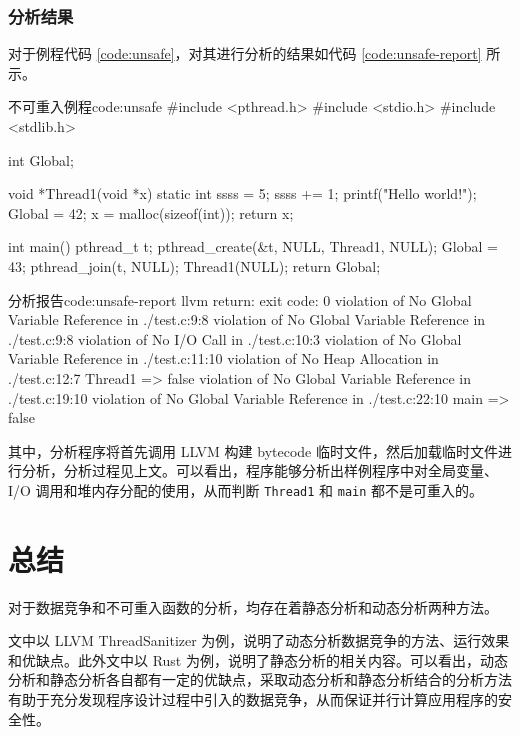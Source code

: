 \documentclass[a4paper, 12pt]{article} %
\newcounter{code}
\numberwithin{equation}{section}
\begin{document}
\subsubsection{分析结果}

对于例程代码 \ref{code:unsafe}，对其进行分析的结果如代码 \ref{code:unsafe-report} 所示。

\begin{code}[c]{不可重入例程}{code:unsafe}
  #include <pthread.h>
  #include <stdio.h>
  #include <stdlib.h>
  
  int Global;
  
  void *Thread1(void *x) {
    static int ssss = 5;
    ssss += 1;
    printf("Hello world!");
    Global = 42;
    x = malloc(sizeof(int));
    return x;
  }
  
  int main() {
    pthread_t t;
    pthread_create(&t, NULL, Thread1, NULL);
    Global = 43;
    pthread_join(t, NULL);
    Thread1(NULL);
    return Global;
  }  
\end{code}

\begin{code}[{}]{分析报告}{code:unsafe-report}
  llvm return: exit code: 0
  violation of No Global Variable Reference in ./test.c:9:8
  violation of No Global Variable Reference in ./test.c:9:8
  violation of No I/O Call in ./test.c:10:3
  violation of No Global Variable Reference in ./test.c:11:10
  violation of No Heap Allocation in ./test.c:12:7
  Thread1 => false
  violation of No Global Variable Reference in ./test.c:19:10
  violation of No Global Variable Reference in ./test.c:22:10
  main => false
\end{code}

其中，分析程序将首先调用 LLVM 构建 bytecode 临时文件，然后加载临时文件进行分析，分析过程见上文。可以看出，程序能够分析出样例程序中对全局变量、I/O 调用和堆内存分配的使用，从而判断 \texttt{Thread1} 和 \texttt{main} 都不是可重入的。

\section{总结}

对于数据竞争和不可重入函数的分析，均存在着静态分析和动态分析两种方法。

文中以 LLVM ThreadSanitizer 为例，说明了动态分析数据竞争的方法、运行效果和优缺点。此外文中以 Rust 为例，说明了静态分析的相关内容。可以看出，动态分析和静态分析各自都有一定的优缺点，采取动态分析和静态分析结合的分析方法有助于充分发现程序设计过程中引入的数据竞争，从而保证并行计算应用程序的安全性。
\end{document}
